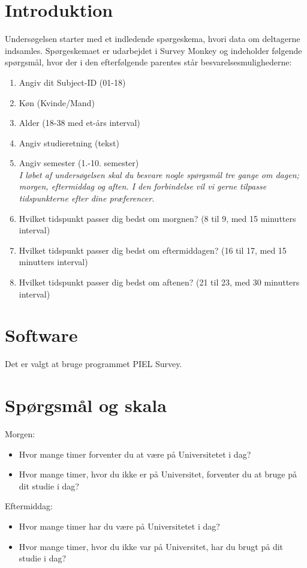 \section*{Introduktion}
Undersøgelsen starter med et indledende spørgeskema, hvori data om deltagerne indsamles. Spørgeskemaet er udarbejdet i Survey Monkey og indeholder følgende spørgsmål, hvor der i den efterfølgende parentes står besvarelsesmulighederne: 
\begin{enumerate}
	\item Angiv dit Subject-ID (01-18)
	\item Køn (Kvinde/Mand)
	\item Alder (18-38 med et-års interval)
	\item Angiv studieretning (tekst)
	\item Angiv semester (1.-10. semester)\\
	\textit{I løbet af undersøgelsen skal du besvare nogle spørgsmål tre gange om dagen; morgen, eftermiddag og aften. I den forbindelse vil vi gerne tilpasse tidspunkterne efter dine præferencer.} 
	\item Hvilket tidspunkt passer dig bedst om morgnen? (8 til 9, med 15 minutters interval)
	\item Hvilket tidspunkt passer dig bedst om eftermiddagen? (16 til 17, med 15 minutters interval)
	\item Hvilket tidspunkt passer dig bedst om aftenen? (21 til 23, med 30 minutters interval)
\end{enumerate}
\section*{Software}
Det er valgt at bruge programmet PIEL Survey. 
\section*{Spørgsmål og skala}
Morgen: 
\begin{itemize}
	\item Hvor mange timer forventer du at være på Universitetet i dag? 
	\item Hvor mange timer, hvor du ikke er på Universitet, forventer du at bruge på dit studie i dag? 
\end{itemize}

\noindent Eftermiddag: 
\begin{itemize}
	\item Hvor mange timer har du være på Universitetet i dag? 
	\item Hvor mange timer, hvor du ikke var på Universitet, har du brugt på dit studie i dag? 
\end{itemize}

